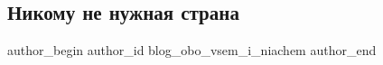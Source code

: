  
 
 
 
 
\subsection{Никому не нужная страна}
\label{sec:15_12_2021.stz.news.ua.vovka.1.nenuzhnaja_strana}


\ifcmt
 author_begin
   author_id blog_obo_vsem_i_niachem
 author_end
\fi

